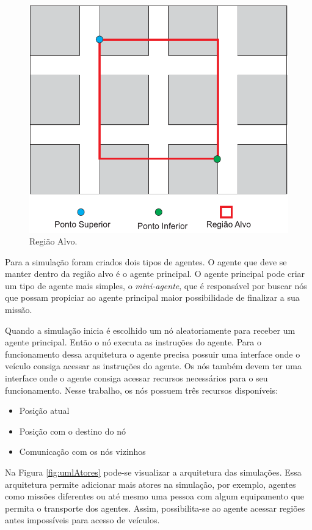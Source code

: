 \begin{figure}[htbp]
	\centering
	\includegraphics[scale=0.7]{metodologia/figuras/regiaoAlvo.pdf}
	\caption{Região Alvo.}
	\label{fig:regiaoAlvo}
\end{figure}

Para a simulação foram criados dois tipos de agentes. O agente que deve se manter dentro da região alvo é o agente principal. O agente principal pode criar um tipo de agente mais simples, o \emph{mini-agente}, que é responsável por buscar nós que possam propiciar ao agente principal maior possibilidade de finalizar a sua missão.

Quando a simulação inicia é escolhido um nó aleatoriamente para receber um agente principal. Então o nó executa as instruções do agente. Para o funcionamento dessa arquitetura o agente precisa possuir uma interface onde o veículo consiga acessar as instruções do agente. Os nós também devem ter uma interface onde o agente consiga acessar recursos necessários para o seu funcionamento. Nesse trabalho, os nós possuem três recursos disponíveis:

\begin{itemize}
	\item Posição atual
	\item Posição com o destino do nó
	\item Comunicação com os nós vizinhos
\end{itemize} 

Na Figura \ref{fig:umlAtores} pode-se visualizar a arquitetura das simulações. Essa arquitetura permite adicionar mais atores na simulação, por exemplo, agentes como missões diferentes ou até mesmo uma pessoa com algum equipamento que permita o transporte dos agentes. Assim, possibilita-se ao agente acessar regiões antes impossíveis para acesso de veículos. 


